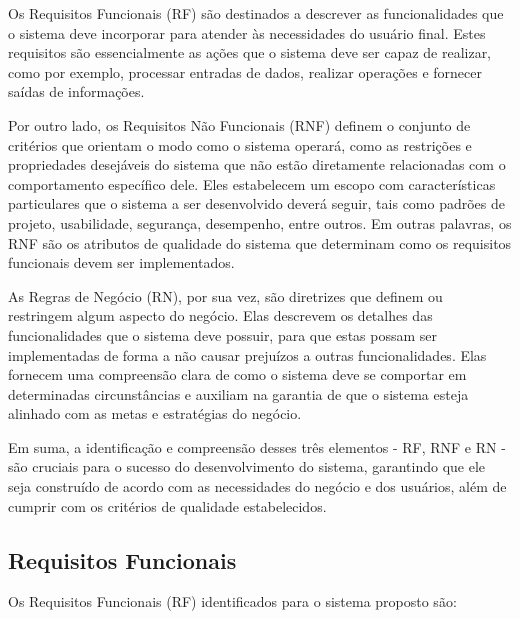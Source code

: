 Os Requisitos Funcionais (RF) são destinados a descrever as funcionalidades que o sistema deve incorporar para atender às necessidades do usuário final. Estes requisitos são essencialmente as ações que o sistema deve ser capaz de realizar, como por exemplo, processar entradas de dados, realizar operações e fornecer saídas de informações.

Por outro lado, os Requisitos Não Funcionais (RNF) definem o conjunto de critérios que orientam o modo como o sistema operará, como as restrições e propriedades desejáveis do sistema que não estão diretamente relacionadas com o comportamento específico dele. Eles estabelecem um escopo com características particulares que o sistema a ser desenvolvido deverá seguir, tais como padrões de projeto, usabilidade, segurança, desempenho, entre outros. Em outras palavras, os RNF são os atributos de qualidade do sistema que determinam como os requisitos funcionais devem ser implementados.

As Regras de Negócio (RN), por sua vez, são diretrizes que definem ou restringem algum aspecto do negócio. Elas descrevem os detalhes das funcionalidades que o sistema deve possuir, para que estas possam ser implementadas de forma a não causar prejuízos a outras funcionalidades. Elas fornecem uma compreensão clara de como o sistema deve se comportar em determinadas circunstâncias e auxiliam na garantia de que o sistema esteja alinhado com as metas e estratégias do negócio.

Em suma, a identificação e compreensão desses três elementos - RF, RNF e RN - são cruciais para o sucesso do desenvolvimento do sistema, garantindo que ele seja construído de acordo com as necessidades do negócio e dos usuários, além de cumprir com os critérios de qualidade estabelecidos.

\subsection{Requisitos Funcionais}

Os Requisitos Funcionais (RF) identificados para o sistema proposto são:

\renewcommand{\therf}{RF\arabic{rf}}

